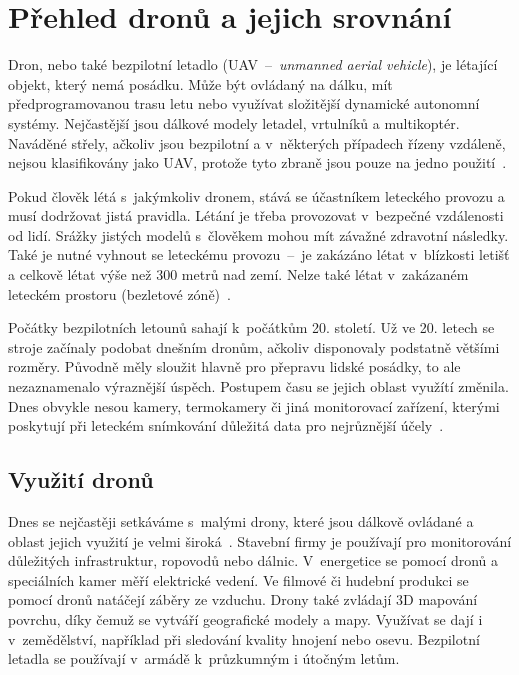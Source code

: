 
\chapter{Přehled dronů a jejich srovnání}
\label{chap_3}

Dron, nebo také bezpilotní letadlo (UAV~--~\textit{unmanned aerial vehicle}), je létající objekt, který nemá posádku. Může být ovládaný na dálku, mít předprogramovanou trasu letu nebo využívat složitější dynamické autonomní systémy. Nejčastější jsou dálkové modely letadel, vrtulníků a multikoptér. Naváděné střely, ačkoliv jsou bezpilotní a v~některých případech řízeny vzdáleně, nejsou klasifikovány jako UAV, protože tyto zbraně jsou pouze na jedno použití~\cite{wikiDrone}.

Pokud člověk létá s~jakýmkoliv dronem, stává se účastníkem leteckého provozu a musí dodržovat jistá pravidla. Létání je třeba provozovat v~bezpečné vzdálenosti od lidí. Srážky jistých modelů s~člověkem mohou mít závažné zdravotní následky. Také je nutné vyhnout se leteckému provozu~--~je zakázáno létat v~blízkosti letišť a celkově létat výše než 300 metrů nad zemí. Nelze také létat v~zakázaném leteckém prostoru (bezletové zóně)~\cite{wikiDrone}.

Počátky bezpilotních letounů sahají k~počátkům 20. století. Už ve 20. letech se stroje začínaly podobat dnešním dronům, ačkoliv disponovaly podstatně většími rozměry. Původně měly sloužit hlavně pro přepravu lidské posádky, to ale nezaznamenalo výraznější úspěch. Postupem času se jejich oblast využítí změnila. Dnes obvykle nesou kamery, termokamery či jiná monitorovací zařízení, kterými poskytují při leteckém snímkování důležitá data pro nejrůznější účely~\cite{wikiDrone}.


\section{Využití dronů}
\label{sec_drones_usage}

Dnes se nejčastěji setkáváme s~malými drony, které jsou dálkově ovládané a oblast jejich využití je velmi široká~\cite{articleDroneUsage}. Stavební firmy je používají pro monitorování důležitých infrastruktur, ropovodů nebo dálnic. V~energetice se pomocí dronů a speciálních kamer měří elektrické vedení. Ve filmové či hudební produkci se pomocí dronů natáčejí záběry ze vzduchu. Drony také zvládají 3D mapování povrchu, díky čemuž se vytváří geografické modely a mapy. Využívat se dají i v~zemědělství, například při sledování kvality hnojení nebo osevu. Bezpilotní letadla se používají v~armádě k~průzkumným i útočným letům.


